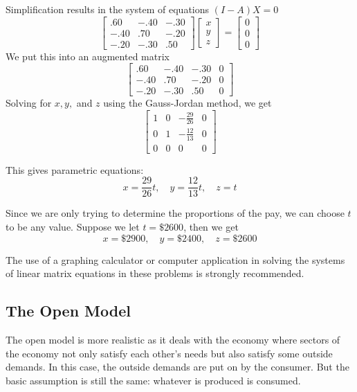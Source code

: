 \begin{solution}
    Simplification results in the system of equations \( (I - A)X = 0 \)
    \[ \begin{bmatrix}
            .60  & -.40 & -.30 \\
            -.40 & .70  & -.20 \\
            -.20 & -.30 & .50
        \end{bmatrix} \begin{bmatrix}
            x \\
            y \\
            z
        \end{bmatrix} = \begin{bmatrix}
            0 \\
            0 \\
            0
        \end{bmatrix} \]
    We put this into an augmented matrix
    \[
        \left[\begin{array}{ccc|c}
                .60  & -.40 & -.30 & 0 \\
                -.40 & .70  & -.20 & 0 \\
                -.20 & -.30 & .50  & 0
            \end{array}\right]
    \]
    Solving for \( x, y, \) and \( z \) using the Gauss-Jordan method, we get
    \[
        \left[\begin{array}{ccc|c}
                1 & 0 & -\frac{29}{26} & 0 \\
                0 & 1 & -\frac{12}{13} & 0 \\
                0 & 0 & 0              & 0
            \end{array}\right]
    \]

    This gives parametric equations:
    \[ x = \frac{29}{26} t, \quad y = \frac{12}{13} t, \quad z = t \]

    Since we are only trying to determine the proportions of the pay, we can choose \( t \) to be any value. Suppose we let \( t = \$2600 \), then we get
    \[ x = \$2900, \quad y = \$2400, \quad z = \$2600 \]

\end{solution}

\begin{note}
    The use of a graphing calculator or computer application in solving the systems of linear matrix equations in these problems is strongly recommended.
\end{note}

\subsection{The Open Model}
The open model is more realistic as it deals with the economy where sectors of the economy not only satisfy each other’s needs but also satisfy some outside demands. In this case, the outside demands are put on by the consumer. But the basic assumption is still the same: whatever is produced is consumed.

